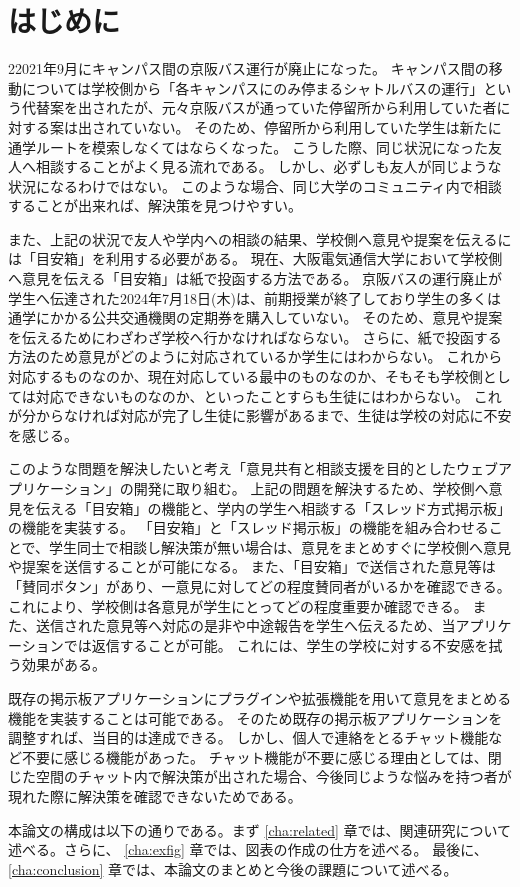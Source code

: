 \documentclass[main]{subfiles}
\begin{document}
\chapter{はじめに}
\label{cha:intro}

22021年9月にキャンパス間の京阪バス運行が廃止になった。
キャンパス間の移動については学校側から「各キャンパスにのみ停まるシャトルバスの運行」という代替案を出されたが、元々京阪バスが通っていた停留所から利用していた者に対する案は出されていない。
そのため、停留所から利用していた学生は新たに通学ルートを模索しなくてはならくなった。
こうした際、同じ状況になった友人へ相談することがよく見る流れである。
しかし、必ずしも友人が同じような状況になるわけではない。
このような場合、同じ大学のコミュニティ内で相談することが出来れば、解決策を見つけやすい。

また、上記の状況で友人や学内への相談の結果、学校側へ意見や提案を伝えるには「目安箱」を利用する必要がある。
現在、大阪電気通信大学において学校側へ意見を伝える「目安箱」は紙で投函する方法である。
京阪バスの運行廃止が学生へ伝達された2024年7月18日(木)は、前期授業が終了しており学生の多くは通学にかかる公共交通機関の定期券を購入していない。
そのため、意見や提案を伝えるためにわざわざ学校へ行かなければならない。
さらに、紙で投函する方法のため意見がどのように対応されているか学生にはわからない。
これから対応するものなのか、現在対応している最中のものなのか、そもそも学校側としては対応できないものなのか、といったことすらも生徒にはわからない。
これが分からなければ対応が完了し生徒に影響があるまで、生徒は学校の対応に不安を感じる。

このような問題を解決したいと考え「意見共有と相談支援を目的としたウェブアプリケーション」の開発に取り組む。
上記の問題を解決するため、学校側へ意見を伝える「目安箱」の機能と、学内の学生へ相談する「スレッド方式掲示板」の機能を実装する。
「目安箱」と「スレッド掲示板」の機能を組み合わせることで、学生同士で相談し解決策が無い場合は、意見をまとめすぐに学校側へ意見や提案を送信することが可能になる。
また、「目安箱」で送信された意見等は「賛同ボタン」があり、一意見に対してどの程度賛同者がいるかを確認できる。
これにより、学校側は各意見が学生にとってどの程度重要か確認できる。
また、送信された意見等へ対応の是非や中途報告を学生へ伝えるため、当アプリケーションでは返信することが可能。
これには、学生の学校に対する不安感を拭う効果がある。

既存の掲示板アプリケーションにプラグインや拡張機能を用いて意見をまとめる機能を実装することは可能である。
そのため既存の掲示板アプリケーションを調整すれば、当目的は達成できる。
しかし、個人で連絡をとるチャット機能など不要に感じる機能があった。
チャット機能が不要に感じる理由としては、閉じた空間のチャット内で解決策が出された場合、今後同じような悩みを持つ者が現れた際に解決策を確認できないためである。

本論文の構成は以下の通りである。まず \ref{cha:related} 章では、関連研究について述べる。さらに、
\ref{cha:exfig} 章では、図表の作成の仕方を述べる。
最後に、\ref{cha:conclusion} 章では、本論文のまとめと今後の課題について述べる。
\end{document}
